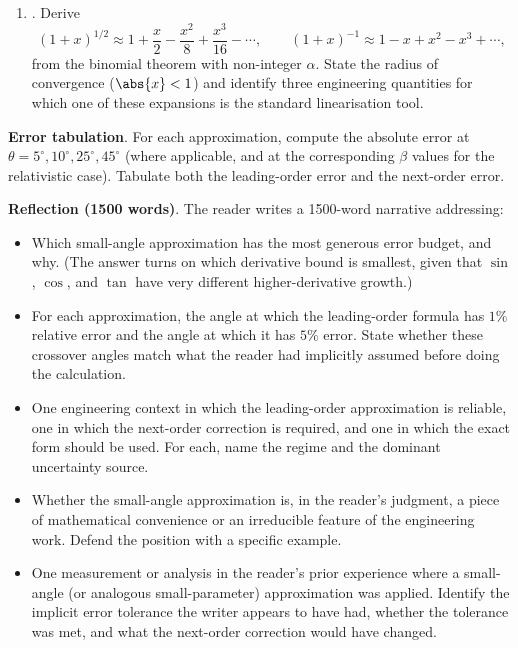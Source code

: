 \begin{project}
\begin{enumerate}[leftmargin=*]
    relativistic kinetic energy is $K = (\gamma - 1) m c^{2}$ with
    $\gamma = 1/\sqrt{1 - v^{2}/c^{2}}$. Expand $\gamma$ in powers of
    $\beta^{2} = v^{2}/c^{2}$ and show that, to leading order in
    $\beta^{2}$,
    \[
    K \approx \frac{1}{2} m v^{2} + \frac{3}{8} m v^{2} \beta^{2}
    + \cdots.
    \]
    The leading-order term is the Newtonian kinetic energy. The
    next-order term is the leading relativistic correction. Identify
    the speed at which the relativistic correction is $1\%$ of the
    Newtonian result.
  \item {}. Derive
    \[
    (1 + x)^{1/2} \approx 1 + \frac{x}{2} - \frac{x^{2}}{8}
    + \frac{x^{3}}{16} - \cdots, \qquad
    (1 + x)^{-1} \approx 1 - x + x^{2} - x^{3} + \cdots,
    \]
    from the binomial theorem with non-integer $\alpha$. State the
    radius of convergence ($\abs{x} < 1$) and identify three
    engineering quantities for which one of these expansions is the
    standard linearisation tool.
\end{enumerate}

\textbf{Error tabulation}. For each approximation, compute the
absolute error at $\theta = 5^{\circ}, 10^{\circ}, 25^{\circ},
45^{\circ}$ (where applicable, and at the corresponding $\beta$ values
for the relativistic case). Tabulate both the leading-order error and
the next-order error.

\textbf{Reflection (1500 words)}. The reader writes a 1500-word
narrative addressing:

\begin{itemize}[leftmargin=*]
  \item Which small-angle approximation has the most generous error
    budget, and why. (The answer turns on which derivative bound is
    smallest, given that $\sin$, $\cos$, and $\tan$ have very
    different higher-derivative growth.)
  \item For each approximation, the angle at which the leading-order
    formula has $1\%$ relative error and the angle at which it has
    $5\%$ error. State whether these crossover angles match what the
    reader had implicitly assumed before doing the calculation.
  \item One engineering context in which the leading-order
    approximation is reliable, one in which the next-order correction
    is required, and one in which the exact form should be used. For
    each, name the regime and the dominant uncertainty source.
  \item Whether the small-angle approximation is, in the reader's
    judgment, a piece of mathematical convenience or an irreducible
    feature of the engineering work. Defend the position with a
    specific example.
  \item One measurement or analysis in the reader's prior experience
    where a small-angle (or analogous small-parameter) approximation
    was applied. Identify the implicit error tolerance the writer
    appears to have had, whether the tolerance was met, and what the
    next-order correction would have changed.
\end{itemize}


\end{project}
